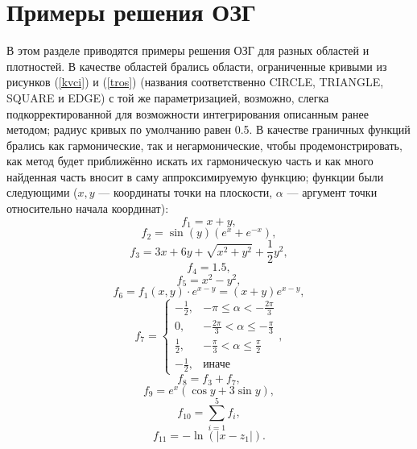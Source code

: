 \documentclass[a4paper, 12pt]{article}
\begin{document}
\section{Примеры решения ОЗГ}
В этом разделе приводятся примеры решения ОЗГ для разных областей и плотностей.
В качестве областей брались области, ограниченные кривыми из рисунков (\ref{kvci}) и (\ref{tros}) (названия соответственно CIRCLE, TRIANGLE, SQUARE и EDGE) с той же параметризацией, возможно, слегка подкорректированной для возможности интегрирования описанным ранее методом; радиус кривых по умолчанию равен 0.5.
В качестве граничных функций брались как гармонические, так и негармонические, чтобы продемонстрировать, как метод будет приближённо искать их гармоническую часть и как много найденная часть вносит в саму аппроксимируемую функцию; функции были следующими ($x,y$ --- координаты точки на плоскости, $\alpha$ --- аргумент точки относительно начала координат):
\begin{equation*}
  f_1=x+y,
\end{equation*}
\begin{equation*}
  f_2=\sin (y) \left(e^x+e^{-x}\right),
\end{equation*}
\begin{equation*}
  f_3=3x+6y+\sqrt{x^2+y^2}+\dfrac{1}{2}y^2,
\end{equation*}
\begin{equation*}
  f_4=1.5,
\end{equation*}
\begin{equation*}
  f_5=x^2-y^2,
\end{equation*}
\begin{equation*}
  f_6=f_1(x,y) \cdot e^{x-y}=(x+y)e^{x-y},
\end{equation*}
\begin{equation*}
  f_7=
  \begin{cases}
    -\frac{1}{2},& -\pi \leq \alpha < -\frac{2 \pi}{3} \\
    0,& -\frac{2 \pi}{3} < \alpha \leq -\frac{\pi}{3} \\
    \frac{1}{2},& -\frac{\pi}{3} < \alpha \leq \frac{\pi}{2}  \\
    -\frac{1}{2},&\text{иначе}
  \end{cases},
\end{equation*}
\begin{equation*}
  f_8=f_3+f_7,
\end{equation*}
\begin{equation*}
  f_9= e^x( \cos y +3\sin  y),
\end{equation*}
\begin{equation*}
  f_{10}= \sum_{i=1}^{5} f_i,
\end{equation*}
\begin{equation*}
  f_{11}= -\ln (|x-z_1|).
\end{equation*}
\end{document}
